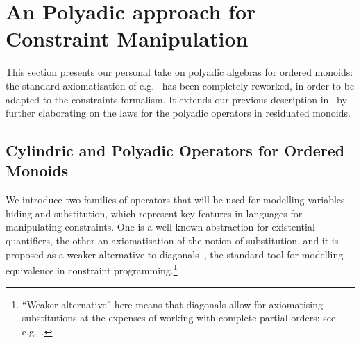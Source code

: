 \documentclass{llncs}
\newcommand{\comment}[1]{}
\def\odiv{\, {\ominus\hspace{-7.7pt} \div} \,}
\begin{document}
\comment{
\begin{example}
\label{notdistr}
Let us consider the monoid $S = \langle \{p,u,n,t\}, \otimes_s, u \rangle$ (with $t$ the top 
of three otherwise unrelated elements): 
$p$ and $n$ intuitively represent the sign of an integer, $t$ tells us that 
the sign cannot be determined, $u$ is the zero
and $\otimes_s$ (which is idempotent) tells us the sign of the addition of two integers, so that 
for all elements $x$ we have
\[x \otimes_s x = u \otimes_s x = x \mbox{  and  } t \otimes_s x = p \otimes_s n = t\]
%
We now add the bottom, in order to obtain a complete lattice.
The $\otimes_s$ is extended in the expected way,  so that $\bot$ is absorbing.
%
Intuitively, $\bot$ states that an element is unsigned:
a pattern the reader familiar with abstract interpretation formalisms will recognise.

The resulting semi-lattice monoid is residuated, with $\odiv$ defined as

$$x \odiv y = \bigg \{\begin{array}{ll}
	t & y \leq x \\
	\bot & \ otherwise
	\end{array}$$
%
Thus, $\odiv$ does not distribute, since 
$\bigvee \{p \odiv n, u \odiv n\}  = \bot < \bigvee \{p, u\} \odiv n = t \odiv n = t$.
\end{example}
}

\section{An Polyadic approach for Constraint Manipulation}\label{sec:newconstraint}

This section presents our personal take on polyadic algebras for ordered monoids:
the standard axiomatisation of e.g.~\cite{sagi2013} has been completely 
reworked, in order to be adapted to the constraints formalism.
%
It extends our previous description in~\cite{festcatuscia} by 
further elaborating on the laws for the polyadic operators in residuated monoids.

\subsection{Cylindric and Polyadic Operators for Ordered Monoids}
\label{cypo}
We  introduce two families of operators 
that will be used
for modelling variables hiding and substitution, which represent
key features in languages for manipulating constraints.
%
One is a well-known abstraction for existential quantifiers,
the other an axiomatisation of the notion of
substitution, and it is proposed as a weaker  alternative 
to diagonals~\cite{popl91}, the standard tool for modelling 
equivalence in constraint programming.\footnote{``Weaker 
alternative'' here means that diagonals allow for axiomatising
substitutions at the expenses of working with complete
partial orders: see e.g.~\cite[Definition 11]{jlamp17}.}
%
\end{document}
